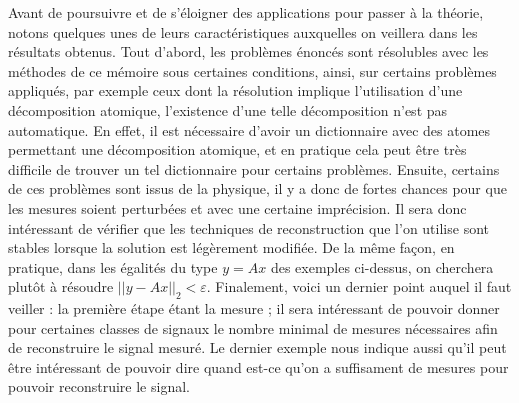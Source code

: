 Avant de poursuivre et de s'éloigner des applications pour passer à la théorie, notons quelques unes de leurs caractéristiques auxquelles on veillera dans les résultats obtenus.
\newline
Tout d'abord, les problèmes énoncés sont résolubles avec les méthodes de ce mémoire sous certaines conditions, ainsi, sur certains problèmes appliqués, par exemple ceux dont la résolution implique l'utilisation d'une décomposition atomique, l'existence d'une telle décomposition n'est pas automatique.
En effet, il est nécessaire d'avoir un dictionnaire avec des atomes permettant une décomposition atomique, et en pratique cela peut être très difficile de trouver un tel dictionnaire pour certains problèmes.
\newline
Ensuite, certains de ces problèmes sont issus de la physique, il y a donc de fortes chances pour que les mesures soient perturbées et avec une certaine imprécision. 
Il sera donc intéressant de vérifier que les techniques de reconstruction que l'on utilise sont stables lorsque la solution est légèrement modifiée.
De la même façon, en pratique, dans les égalités du type $y=Ax$ des exemples ci-dessus, on cherchera plutôt à résoudre $||y-Ax||_2 < \varepsilon$.
\newline
Finalement, voici un dernier point auquel il faut veiller : la première étape étant la mesure ; il sera intéressant de pouvoir donner pour certaines classes de signaux le nombre minimal de mesures nécessaires afin de reconstruire le signal mesuré.
Le dernier exemple nous indique aussi qu'il peut être intéressant de pouvoir dire quand est-ce qu'on a suffisament de mesures pour pouvoir reconstruire le signal.

